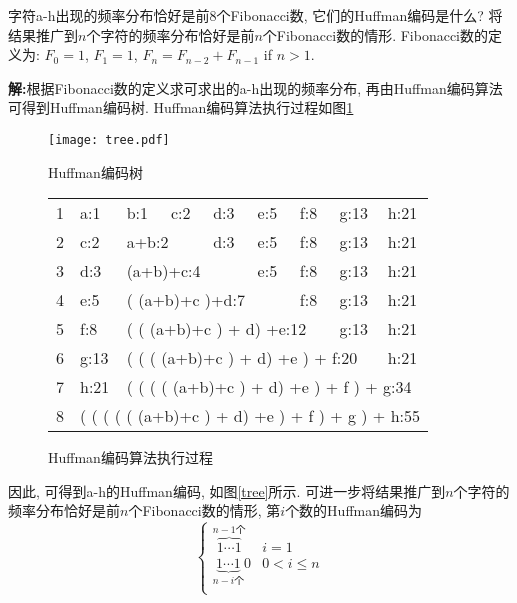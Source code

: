 \begin{problem}[习题4.2]
字符a-h出现的频率分布恰好是前8个Fibonacci数, 它们的Huffman编码是什么? 将结果推广到$n$个字符的频率分布恰好是前$n$个Fibonacci数的情形. Fibonacci数的定义为: $F_0=1$, $F_1=1$, $F_n = F_{n-2}+F_{n-1}$ if $n>1$.
\end{problem}
\begin{solution}
\textbf{解:}根据Fibonacci数的定义求可求出的a-h出现的频率分布, 再由Huffman编码算法可得到Huffman编码树. Huffman编码算法执行过程如图\ref{ah}
\begin{figure}[!htb]
\begin{minipage}[b]{.4\textwidth}
\centering
\texttt{[image: tree.pdf]}
\caption{\label{tree}Huffman编码树}
\end{minipage}%
\begin{minipage}[b]{.6\textwidth}
\centering
\begin{tabular}{l|llllll|l|l|}
\cline{2-9}
1 & \multicolumn{1}{l|}{a:1} & \multicolumn{1}{l|}{b:1} & \multicolumn{1}{l|}{c:2} & \multicolumn{1}{l|}{d:3} & \multicolumn{1}{l|}{e:5} & f:8 & g:13 & h:21 \\
\cline{2-9}
2 & \multicolumn{1}{l|}{c:2} & \multicolumn{2}{l|}{a+b:2} & \multicolumn{1}{l|}{d:3} & \multicolumn{1}{l|}{e:5} & f:8 & g:13 & h:21 \\
\cline{2-9}
3 & \multicolumn{1}{l|}{d:3} & \multicolumn{3}{l|}{(a+b)+c:4} & \multicolumn{1}{l|}{e:5} & f:8 & g:13 & h:21 \\
\cline{2-9}
4 & \multicolumn{1}{l|}{e:5} & \multicolumn{4}{l|}{( (a+b)+c )+d:7} & f:8 & g:13 & h:21 \\
\cline{2-9}
5 & \multicolumn{1}{l|}{f:8} & \multicolumn{5}{l|}{( ( (a+b)+c ) + d) +e:12} & g:13 & h:21 \\
\cline{2-9}
6 & \multicolumn{1}{l|}{g:13} & \multicolumn{6}{l|}{( ( ( (a+b)+c ) + d) +e ) + f:20} & h:21 \\
\cline{2-9}
7 & \multicolumn{1}{l|}{h:21} & \multicolumn{7}{l|}{( ( ( ( (a+b)+c ) + d) +e ) + f ) + g:34} \\
\cline{2-9}
8 & \multicolumn{8}{l|}{( ( ( ( ( (a+b)+c ) + d) +e ) + f ) + g ) + h:55} \\
\cline{2-9}
\end{tabular}
\caption{\label{ah}Huffman编码算法执行过程}
\end{minipage}
\end{figure}
因此, 可得到a-h的Huffman编码, 如图\ref{tree}所示. 可进一步将结果推广到$n$个字符的频率分布恰好是前$n$个Fibonacci数的情形, 第$i$个数的Huffman编码为
\begin{displaymath}
\left\{ \begin{array}{ll}
\overbrace{1\cdots 1}^{n-1\textrm{个}} & i = 1\\
\underbrace{1\cdots 1}_{n-i\textrm{个}}0 & 0< i \leq n\\
\end{array} \right.
\end{displaymath}
\end{solution}
